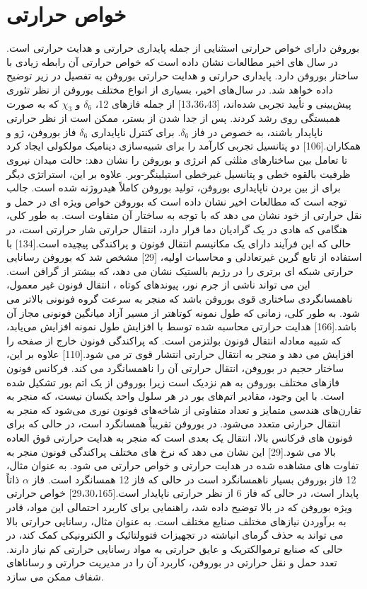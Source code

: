 \section{خواص حرارتی}
بوروفن دارای خواص حرارتی استثنایی از جمله پایداری حرارتی و هدایت حرارتی است. در سال های اخیر مطالعات نشان داده است که خواص حرارتی آن رابطه زیادی با ساختار بوروفن دارد. پایداری حرارتی و هدایت حرارتی بوروفن به تفصیل در زیر توضیح داده خواهد شد. در سال‌های اخیر، بسیاری از انواع مختلف بوروفن از نظر تئوری پیش‌بینی و تأیید تجربی شده‌اند، [13،36،43] از جمله فازهای 12، $\delta_6$ و $\chi_3$ که به صورت همبستگی روی  رشد کردند. پس از جدا شدن از بستر، ممکن است از نظر حرارتی ناپایدار باشند، به خصوص در فاز $\delta_6$. برای کنترل ناپایداری $\delta_6$ فاز بوروفن، ژو و همکاران.[106] دو پتانسیل تجربی کارآمد را برای شبیه‌سازی دینامیک مولکولی ایجاد کرد تا تعامل بین ساختارهای مثلثی کم انرژی و بوروفن را نشان دهد: حالت میدان نیروی ظرفیت بالقوه خطی و پتانسیل غیرخطی استیلینگر-وبر. علاوه بر این، استراتژی دیگر برای از بین بردن ناپایداری بوروفن، تولید بوروفن کاملاً هیدروژنه شده است. جالب توجه است که مطالعات اخیر نشان داده است که بوروفن خواص ویژه ای در حمل و نقل حرارتی از خود نشان می دهد که با توجه به ساختار آن متفاوت است. به طور کلی، هنگامی که هادی در یک گرادیان دما قرار دارد، انتقال حرارتی شار حرارتی است، در حالی که این فرآیند دارای یک مکانیسم انتقال فونون و پراکندگی پیچیده است.[134] با استفاده از تابع گرین غیرتعادلی  و محاسبات اولیه، [29] مشخص شد که بوروفن رسانایی حرارتی شبکه ای برتری را در رژیم بالستیک نشان می دهد، که بیشتر از گرافن است. این می تواند ناشی از جرم نور، پیوندهای کوتاه ، انتقال فونون غیر معمول، ناهمسانگردی ساختاری قوی بوروفن باشد که منجر به سرعت گروه فونونی بالاتر می شود. به طور کلی، زمانی که طول نمونه کوتاهتر از مسیر آزاد میانگین فونونی مجاز آن باشد.[166] هدایت حرارتی محاسبه شده توسط  با افزایش طول نمونه افزایش می‌یابد، که شبیه معادله انتقال فونون بولتزمن است. که پراکندگی فونون خارج از صفحه را افزایش می دهد و منجر به انتقال حرارتی انتشار قوی تر می شود.[110] علاوه بر این، ساختار حجیم در بوروفن، انتقال حرارتی آن را ناهمسانگرد می کند. فرکانس فونون فازهای مختلف بوروفن به هم نزدیک است زیرا بوروفن از یک اتم بور تشکیل شده است. با این وجود، مقادیر اتم‌های بور در هر سلول واحد یکسان نیست، که منجر به تقارن‌های هندسی متمایز و تعداد متفاوتی از شاخه‌های فونون نوری می‌شود که منجر به انتقال حرارتی متعدد می‌شود. در بوروفن تقریباً همسانگرد است، در حالی که برای فونون های فرکانس بالا، انتقال یک بعدی است که منجر به هدایت حرارتی فوق العاده بالا می شود.[29] این نشان می دهد که نرخ های مختلف پراکندگی فونون منجر به تفاوت های مشاهده شده در هدایت حرارتی و خواص حرارتی می شود. به عنوان مثال، 12 فاز بوروفن بسیار ناهمسانگرد است در حالی که فاز 12 همسانگرد است. فاز $\alpha$ ذاتاً پایدار است، در حالی که فاز 6 از نظر حرارتی ناپایدار است.[29،30،165] خواص حرارتی ویژه بوروفن که در بالا توضیح داده شد، راهنمایی برای کاربرد احتمالی این مواد، قادر به برآوردن نیازهای مختلف صنایع مختلف است. به عنوان مثال، رسانایی حرارتی بالا می تواند به حذف گرمای انباشته در تجهیزات فتوولتائیک و الکترونیکی کمک کند، در حالی که صنایع ترموالکتریک و عایق حرارتی به مواد رسانایی حرارتی کم نیاز دارند. تعدد حمل و نقل حرارتی در بوروفن، کاربرد آن را در مدیریت حرارتی و رساناهای شفاف ممکن می سازد.
